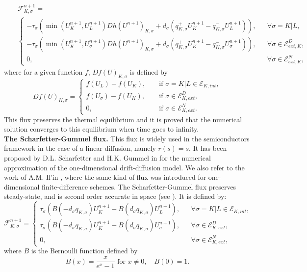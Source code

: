 \documentclass[smallextended]{svjour3}
\begin{document}
\begin{eqnarray*}
& &\mathcal{F}_{K,\sigma}^{n+1}= \\
& &\left\{\begin{array}{lll}-\tau_{\sigma}\left(\min\left(U_{K}^{n+1},U_{L}^{n+1}\right)Dh\left(U^{n+1}\right)_{K,\sigma}+d_{\sigma}\left(q_{K,\sigma}^{+}U_{K}^{n+1}-q_{K,\sigma}^{-}U_{L}^{n+1}\right)\right), & & \forall \sigma=K|L,\\ -\tau_{\sigma}\left(\min\left(U_{K}^{n+1},U_{\sigma}^{n+1}\right)Dh\left(U^{n+1}\right)_{K,\sigma}+d_{\sigma}\left(q_{K,\sigma}^{+}U_{K}^{n+1}-q_{K,\sigma}^{-}U_{\sigma}^{n+1}\right)\right), & & \forall \sigma \in \mathcal{E}_{ext,K}^{D}, \\ 0, & &  \forall \sigma \in \mathcal{E}_{ext,K}^{N}, \end{array}\right.
\end{eqnarray*}
where for a given function $f$, $Df(U)_{K,\sigma}$ is defined by
\begin{equation*}
Df(U)_{K,\sigma}=\left\{\begin{array}{lll} f(U_{L})-f(U_{K}), & & \text{ if } \sigma=K|L \in \mathcal{E}_{K,int}, \\ f(U_{\sigma})-f(U_{K}), & & \text{ if } \sigma \in \mathcal{E}_{K,ext}^{D}, \\ 0, & & \text{ if } \sigma \in \mathcal{E}_{K,ext}^{N}.\end{array}\right.
\end{equation*}
This flux preserves the thermal equilibrium and it is proved that the numerical solution converges to this equilibrium when time goes to infinity.\\
\textbf{The Scharfetter-Gummel flux.} This flux is widely used in the semiconductors framework in the case of a linear diffusion, namely $r(s)=s$. It has been proposed by D.L. Scharfetter and H.K. Gummel in \cite{Scharfetter1969} for the numerical approximation of the one-dimensional drift-diffusion model. We also refer to the work of A.M. Il'in \cite{Il'in1969}, where the same kind of flux was introduced for one-dimensional finite-difference schemes. The Scharfetter-Gummel flux preserves steady-state, and is second order accurate in space (see \cite{Lazarov1996}). It is defined by:
\begin{equation*}
\mathcal{F}_{K,\sigma}^{n+1}=\left\{\begin{array}{lll}\tau_{\sigma}\left(B(-d_{\sigma}q_{K,\sigma})U_{K}^{n+1}-B(d_{\sigma}q_{K,\sigma})U_{L}^{n+1}\right), & &  \forall \sigma=K|L \in \mathcal{E}_{K,int},\\ \tau_{\sigma}\left(B(-d_{\sigma}q_{K,\sigma})U_{K}^{n+1}-B(d_{\sigma}q_{K,\sigma})U_{\sigma}^{n+1}\right), & &  \forall \sigma \in \mathcal{E}_{K,ext}^{D},\\ 0, & &  \forall \sigma \in \mathcal{E}_{K,ext}^{N},\end{array}\right.
\end{equation*}
where $B$ is the Bernoulli function defined by
\begin{equation*}
B(x)=\frac{x}{e^{x}-1} \text{ for } x \neq 0, \quad B(0)=1.
\end{equation*}
\end{document}
